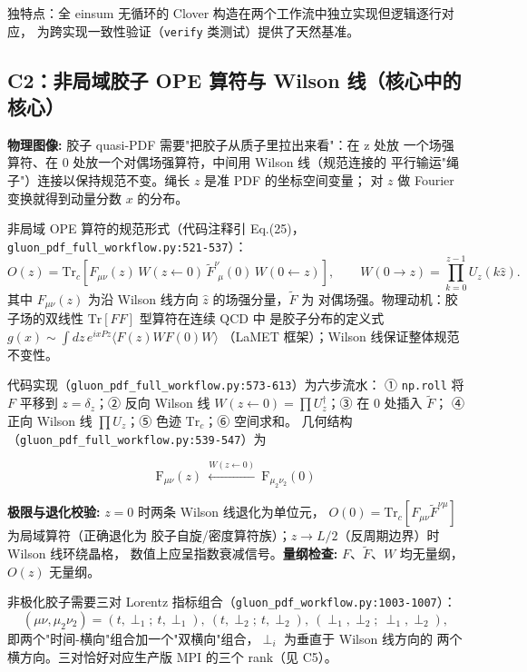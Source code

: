 \documentclass[UTF8]{ctexart}
\begin{document}
独特点：全 einsum 无循环的 Clover 构造在两个工作流中独立实现但逻辑逐行对应，
为跨实现一致性验证（\texttt{verify} 类测试）提供了天然基准。

\subsection{C2：非局域胶子 OPE 算符与 Wilson 线（核心中的核心）}

\begin{physbox}
\textbf{物理图像:} 胶子 quasi-PDF 需要"把胶子从质子里拉出来看"：在 z 处放
一个场强算符、在 0 处放一个对偶场强算符，中间用 Wilson 线（规范连接的
平行输运"绳子"）连接以保持规范不变。绳长 $z$ 是准 PDF 的坐标空间变量；
对 $z$ 做 Fourier 变换就得到动量分数 $x$ 的分布。
\end{physbox}

非局域 OPE 算符的规范形式（代码注释引 Eq.(25)，\texttt{\nolinkurl{gluon\_pdf\_full\_workflow.py:521-537}}）：
\begin{equation}\label{eq:ope}
O(z) = \mathrm{Tr}_c\!\left[ F_{\mu\nu}(z)\, W(z{\leftarrow}0)\,
\tilde{F}^{\nu}_{\ \,\mu}(0)\, W(0{\leftarrow}z) \right],
\qquad
W(0{\to}z) = \prod_{k=0}^{z-1} U_z(k\hat{z}).
\end{equation}
其中 $F_{\mu\nu}(z)$ 为沿 Wilson 线方向 $\hat{z}$ 的场强分量，$\tilde{F}$ 为
对偶场强。物理动机：胶子场的双线性 $\mathrm{Tr}[F F]$ 型算符在连续 QCD 中
是胶子分布的定义式 $g(x) \sim \int dz\, e^{ixPz}\langle F(z)WF(0)W\rangle$
（LaMET 框架）；Wilson 线保证整体规范不变性。

代码实现（\texttt{\nolinkurl{gluon\_pdf\_full\_workflow.py:573-613}}）为六步流水：
① \texttt{np.roll} 将 $F$ 平移到 $z=\delta_z$；② 反向 Wilson 线
$W(z{\leftarrow}0)=\prod U_z^\dagger$；③ 在 0 处插入 $\tilde{F}$；
④ 正向 Wilson 线 $\prod U_z$；⑤ 色迹 $\mathrm{Tr}_c$；⑥ 空间求和。
几何结构（\texttt{\nolinkurl{gluon\_pdf\_full\_workflow.py:539-547}}）为

\[
\text{F}_{\mu\nu}(z)\ \xleftarrow{W(z\leftarrow 0)}\ \text{F}_{\mu_2\nu_2}(0)
\]

\textbf{极限与退化校验:} $z=0$ 时两条 Wilson 线退化为单位元，
$O(0)=\mathrm{Tr}_c[F_{\mu\nu}\tilde{F}^{\nu\mu}]$ 为局域算符（正确退化为
胶子自旋/密度算符族）；$z\to L/2$（反周期边界）时 Wilson 线环绕晶格，
数值上应呈指数衰减信号。\textbf{量纲检查:} $F$、$\tilde{F}$、$W$ 均无量纲，
$O(z)$ 无量纲。

非极化胶子需要三对 Lorentz 指标组合（\texttt{\nolinkurl{gluon\_pdf\_workflow.py:1003-1007}}）：
\begin{equation}\label{eq:pairs}
(\mu\nu,\mu_2\nu_2) = (t,\perp_1;\ t,\perp_1),\ (t,\perp_2;\ t,\perp_2),\ 
(\perp_1,\perp_2;\ \perp_1,\perp_2),
\end{equation}
即两个"时间-横向"组合加一个"双横向"组合，$\perp_i$ 为垂直于 Wilson 线方向的
两个横方向。三对恰好对应生产版 MPI 的三个 rank（见 C5）。
\end{document}
